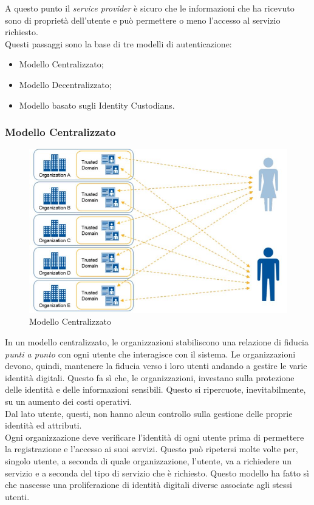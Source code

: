 A questo punto il \textit{service provider} è sicuro che le informazioni che ha ricevuto sono di proprietà dell'utente e può permettere o meno l'accesso al servizio richiesto.\\
Questi passaggi sono la base di tre modelli di autenticazione:
\begin{itemize}
	\item Modello Centralizzato;
	\item Modello Decentralizzato;
	\item Modello basato sugli Identity Custodians.
\end{itemize}

\subsubsection{Modello Centralizzato}
\begin{figure}[!h]
	\centering
	\includegraphics[scale=0.5]{immagini/ITF_Centralizzato}
	\caption{Modello Centralizzato}
\end{figure}
In un modello centralizzato, le organizzazioni stabiliscono una relazione di fiducia \textit{punti a punto} con ogni utente che interagisce con il sistema.
Le organizzazioni devono, quindi, mantenere la fiducia verso i loro utenti andando a gestire le varie identità digitali. Questo fa sì che, le organizzazioni, investano sulla protezione delle identità e delle informazioni sensibili. Questo si ripercuote, inevitabilmente, su un aumento dei costi operativi.\\
Dal lato utente, questi, non hanno alcun controllo sulla gestione delle proprie identità ed attributi.\\
Ogni organizzazione deve verificare l'identità di ogni utente prima di permettere la registrazione e l'accesso ai suoi servizi. Questo può ripetersi molte volte per, singolo utente, a seconda di quale organizzazione, l'utente, va a richiedere un servizio e a seconda del tipo di servizio che è richiesto. 
Questo modello ha fatto sì che nascesse una proliferazione di identità digitali diverse associate agli stessi utenti\cite{ITF_gartner}.
